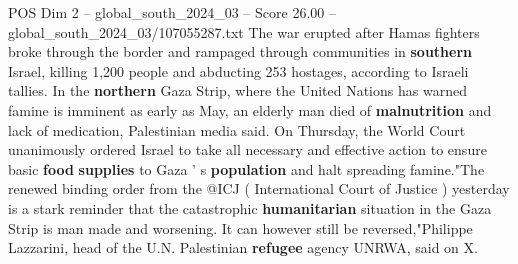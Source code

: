 \begin{textsample}{POS Dim 2 – global\_south\_2024\_03 – Score 26.00 – global\_south\_2024\_03/107055287.txt}
The war erupted after Hamas fighters broke through the border and rampaged through communities in \textbf{southern} Israel, killing 1,200 people and abducting 253 hostages, according to Israeli tallies.
In the \textbf{northern} Gaza Strip, where the United Nations has warned famine is imminent as early as May, an elderly man died of \textbf{malnutrition} and lack of medication, Palestinian media said.
On Thursday, the World Court unanimously ordered Israel to take all necessary and effective action to ensure basic \textbf{food} \textbf{supplies} to Gaza ' s \textbf{population} and halt spreading famine."The renewed binding order from the @ICJ ( International Court of Justice ) yesterday is a stark reminder that the catastrophic \textbf{humanitarian} situation in the Gaza Strip is man made and worsening.
It can however still be reversed,"Philippe Lazzarini, head of the U.N.
Palestinian \textbf{refugee} agency UNRWA, said on X.

\end{textsample}
